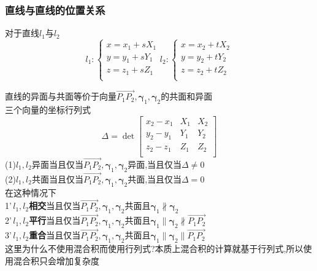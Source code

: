 \documentclass{article}
\newcommand{\ve}{\boldsymbol}
\begin{document}
\begin{CJK}{UTF8}{gkai}
\subsubsection*{直线与直线的位置关系}
对于直线$l_1$与$l_2$
\begin{equation*}
    l_1:
\begin{cases}
x=x_1+sX_1\\
y=y_1+sY_1\\
z=z_1+sZ_1\\
\end{cases}
    l_2:
    \begin{cases}
        x=x_2+tX_2\\
        y=y_2+tY_2\\
        z=z_2+tZ_2\\
    \end{cases}
\end{equation*}


直线的异面与共面等价于向量$\overrightarrow{P_1P_2},\ve{\gamma}_1,\ve{\gamma}_2$的共面和异面\\
三个向量的坐标行列式
\[\Delta=\det
\begin{bmatrix}
    x_2-x_1&X_1&X_2\\
    y_2-y_1&Y_1&Y_2\\
    z_2-z_1&Z_1&Z_2\\    
\end{bmatrix}\]
(1)$l_1,l_2$异面当且仅当$\overrightarrow{P_1P_2},\ve{\gamma}_1,\ve{\gamma}_2$异面,当且仅当$\Delta\neq 0$\\

(2)$l_1,l_2$共面当且仅当$\overrightarrow{P_1P_2},\ve{\gamma}_1,\ve{\gamma}_2$共面,当且仅当$\Delta  =  0$\\
在这种情况下\\

1'\,$l_1,l_2$\textbf{相交}当且仅当$\overrightarrow{P_1P_2},\ve{\gamma}_1,\ve{\gamma}_2$共面且$\ve{\gamma}_1\nparallel \ve{\gamma}_2$\\
2'\,$l_1,l_2$\textbf{平行}当且仅当$\overrightarrow{P_1P_2},\ve{\gamma}_1,\ve{\gamma}_2$共面且$\ve{\gamma}_1\parallel \ve{\gamma}_2\nparallel\overrightarrow{P_1P_2}$\\
3'\,$l_1,l_2$\textbf{重合}当且仅当$\overrightarrow{P_1P_2},\ve{\gamma}_1,\ve{\gamma}_2$共面且$\ve{\gamma}_1\parallel \ve{\gamma}_2\parallel\overrightarrow{P_1P_2}$\\
这里为什么不使用混合积而使用行列式?本质上混合积的计算就基于行列式,所以使用混合积只会增加复杂度\\


\end{CJK}
\end{document}
